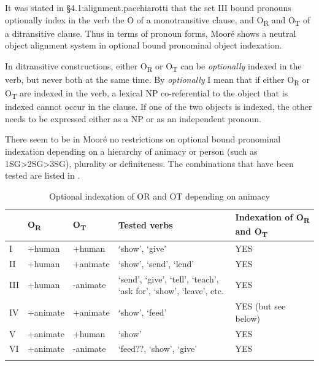 \documentclass[output=paper]{langsci/langscibook}
\begin{document}
\z

It was stated in {§4.1:alignment.pacchiarotti} that the set III bound pronouns optionally index in the verb the O of a monotransitive clause, and O\textsubscript{R} and O\textsubscript{T} of a ditransitive clause. Thus in terms of pronoun forms, Mooré shows a neutral object alignment system in optional bound pronominal object indexation.  

In ditransitive constructions, either O\textsubscript{R} or O\textsubscript{T} can be \textit{optionally} indexed in the verb, but never both at the same time. By \textit{optionally} I mean that if either O\textsubscript{R} or O\textsubscript{T} are indexed in the verb, a lexical NP co-referential to the object that is indexed cannot occur in the clause. If one of the two objects is indexed, the other needs to be expressed either as a NP or as an independent pronoun. 

There seem to be in Mooré no restrictions on optional bound pronominal indexation depending on a hierarchy of animacy or person (such as 1SG>2SG>3SG), plurality or definiteness. The combinations that have been tested are listed in .

\begin{table}
\begin{tabularx}{\textwidth}{lll>{\raggedright\arraybackslash}Xl} \lsptoprule & \textbf{O}\textbf{\textsubscript{R}} & \textbf{O}\textbf{\textsubscript{T}} & \textbf{Tested verbs} & \textbf{Indexation of O}\textbf{\textsubscript{R}}\textbf{ and O}\textbf{\textsubscript{T}}\textbf{} \\
\midrule
I & +human & +human & `show', `give' & YES\\
II & +human & +animate & `show', `send', `lend' & YES\\
III & +human & -animate & `send', `give', `tell', `teach', `ask for', `show', `leave', etc. & YES\\
IV & +animate & +animate & `show', `feed' & YES (but see below)\\
V & +animate & +human & `show' & YES\\
VI & +animate & -animate & `feed??, `show', `give' & YES\\
\lspbottomrule
\end{tabularx}
\caption{Optional indexation of OR and OT depending on animacy}
\label{tab:3.pacchiarotti}

 \end{table}
\end{document}
